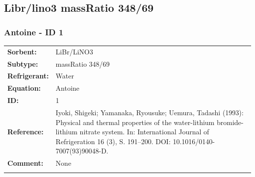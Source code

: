 \subsection{Libr/lino3 massRatio 348/69}
%
\subsubsection{Antoine - ID 1}
%
\begin{tabular}[l]{|lp{11.5cm}|}
\hline
\addlinespace

\textbf{Sorbent:} & LiBr/LiNO3 \\
\textbf{Subtype:} & massRatio 348/69 \\
\textbf{Refrigerant:} & Water \\
\textbf{Equation:} & Antoine \\
\textbf{ID:} & 1 \\
\textbf{Reference:} & Iyoki, Shigeki; Yamanaka, Ryousuke; Uemura, Tadashi (1993): Physical and thermal properties of the water-lithium bromide-lithium nitrate system. In: International Journal of Refrigeration 16 (3), S. 191–200. DOI: 10.1016/0140-7007(93)90048-D. \\
\textbf{Comment:} & None \\

\addlinespace
\hline
\end{tabular}
\newline

